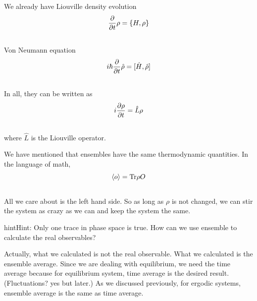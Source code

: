 \documentclass[letterpaper,10pt,english]{sphinxmanual}
\newcommand{\avg}[1]{\left< #1 \right>}
\begin{document}
We already have Liouville density evolution
\begin{gather}
\begin{split}\frac{\partial}{\partial t} \rho = \{ H, \rho \}\end{split}\notag\\\begin{split}\end{split}\notag
\end{gather}
Von Neumann equation
\begin{gather}
\begin{split}i\hbar \frac{\partial}{\partial t} \hat\rho = [\hat H, \hat\rho ]\end{split}\notag\\\begin{split}\end{split}\notag
\end{gather}
In all, they can be written as
\begin{gather}
\begin{split}i \frac{\partial\rho}{\partial t} = \hat L \rho\end{split}\notag\\\begin{split}\end{split}\notag
\end{gather}
where $\hat L$ is the Liouville operator.

We have mentioned that ensembles have the same thermodynamic quantities. In the language of math,
\begin{gather}
\begin{split}\avg{o} = \mathrm{Tr} \rho O\end{split}\notag\\\begin{split}\end{split}\notag
\end{gather}
All we care about is the left hand side. So as long as $\rho$ is not changed, we can stir the system as crazy as we can and keep the system the same.

\begin{notice}{hint}{Hint:}
Only one trace in phase space is true. How can we use ensemble to calculate the real observables?

Actually, what we calculated is not the real observable. What we calculated is the ensemble average. Since we are dealing with equilibrium, we need the time average because for equilibrium system, time average is the desired result. (Fluctuations? yes but later.) As we discussed previously, for ergodic systems, ensemble average is the same as time average.
\end{notice}
\end{document}

